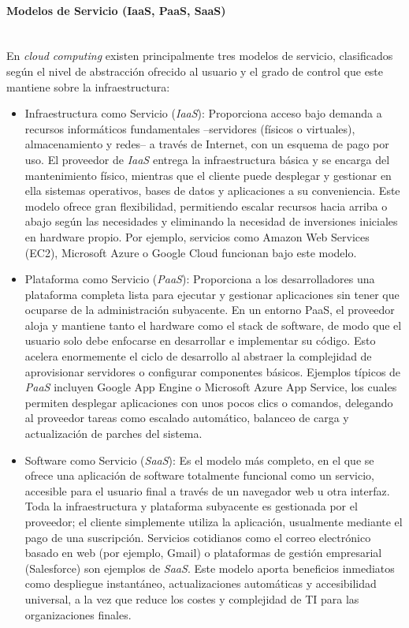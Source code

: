 \documentclass[12pt,twoside,titlepage]{report}
\begin{document}
\paragraph{Modelos de Servicio (IaaS, PaaS, SaaS) \\ \\}
En \textit{cloud computing} existen principalmente tres modelos de servicio, clasificados según el nivel de abstracción ofrecido al usuario y el grado de control que este mantiene sobre la infraestructura:
\begin{itemize}
\item Infraestructura como Servicio (\textit{IaaS}): Proporciona acceso bajo demanda a recursos informáticos fundamentales –servidores (físicos o virtuales), almacenamiento y redes– a través de Internet, con un esquema de pago por uso. El proveedor de \textit{IaaS} entrega la infraestructura básica y se encarga del mantenimiento físico, mientras que el cliente puede desplegar y gestionar en ella sistemas operativos, bases de datos y aplicaciones a su conveniencia. Este modelo ofrece gran flexibilidad, permitiendo escalar recursos hacia arriba o abajo según las necesidades y eliminando la necesidad de inversiones iniciales en hardware propio. Por ejemplo, servicios como Amazon Web Services (EC2), Microsoft Azure o Google Cloud funcionan bajo este modelo.

\item Plataforma como Servicio (\textit{PaaS}): Proporciona a los desarrolladores una plataforma completa  lista para ejecutar y gestionar aplicaciones sin tener que ocuparse de la administración subyacente. En un entorno PaaS, el proveedor aloja y mantiene tanto el hardware como el stack de software, de modo que el usuario solo debe enfocarse en desarrollar e implementar su código. Esto acelera enormemente el ciclo de desarrollo al abstraer la complejidad de aprovisionar servidores o configurar componentes básicos. Ejemplos típicos de \textit{PaaS} incluyen Google App Engine o Microsoft Azure App Service, los cuales permiten desplegar aplicaciones con unos pocos clics o comandos, delegando al proveedor tareas como escalado automático, balanceo de carga y actualización de parches del sistema.

\item Software como Servicio (\textit{SaaS}): Es el modelo más completo, en el que se ofrece una aplicación de software totalmente funcional como un servicio, accesible para el usuario final a través de un navegador web u otra interfaz. Toda la infraestructura y plataforma subyacente es gestionada por el proveedor; el cliente simplemente utiliza la aplicación, usualmente mediante el pago de una suscripción. Servicios cotidianos como el correo electrónico basado en web (por ejemplo, Gmail) o plataformas de gestión empresarial (Salesforce) son ejemplos de \textit{SaaS}. Este modelo aporta beneficios inmediatos como despliegue instantáneo, actualizaciones automáticas y accesibilidad universal, a la vez que reduce los costes y complejidad de TI para las organizaciones finales.
\end{itemize}
\end{document}
